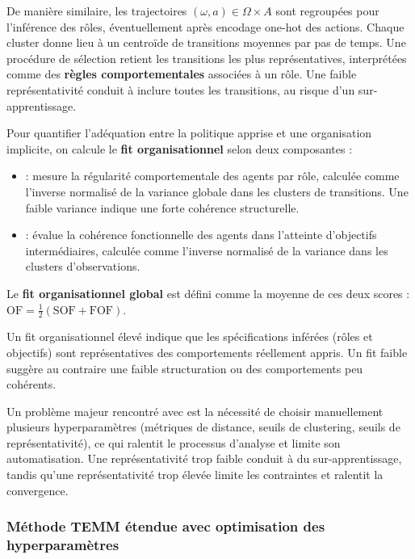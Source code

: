De manière similaire, les trajectoires $(\omega, a) \in \Omega \times A$ sont regroupées pour l'inférence des rôles, éventuellement après encodage one-hot des actions. Chaque cluster donne lieu à un centroïde de transitions moyennes par pas de temps. Une procédure de sélection retient les transitions les plus représentatives, interprétées comme des \textbf{règles comportementales} associées à un rôle. Une faible représentativité conduit à inclure toutes les transitions, au risque d'un sur-apprentissage.

Pour quantifier l'adéquation entre la politique apprise et une organisation implicite, on calcule le \textbf{fit organisationnel} selon deux composantes :
\begin{itemize}
    \item \textbf{} : mesure la régularité comportementale des agents par rôle, calculée comme l'inverse normalisé de la variance globale dans les clusters de transitions. Une faible variance indique une forte cohérence structurelle.
    \item \textbf{} : évalue la cohérence fonctionnelle des agents dans l'atteinte d'objectifs intermédiaires, calculée comme l'inverse normalisé de la variance dans les clusters d'observations.
\end{itemize}

\noindent Le \textbf{fit organisationnel global} est défini comme la moyenne de ces deux scores : $\text{OF} = \frac{1}{2} \left( \text{SOF} + \text{FOF} \right)$.

Un fit organisationnel élevé indique que les spécifications inférées (rôles et objectifs) sont représentatives des comportements réellement appris. Un fit faible suggère au contraire une faible structuration ou des comportements peu cohérents.

Un problème majeur rencontré avec  est la nécessité de choisir manuellement plusieurs hyperparamètres (métriques de distance, seuils de clustering, seuils de représentativité), ce qui ralentit le processus d'analyse et limite son automatisation. Une représentativité trop faible conduit à du sur-apprentissage, tandis qu'une représentativité trop élevée limite les contraintes et ralentit la convergence.

\subsubsection{Méthode TEMM étendue avec optimisation des hyperparamètres}

